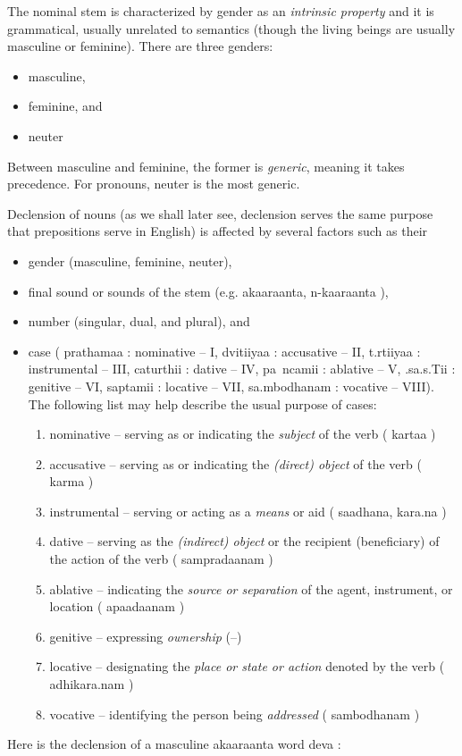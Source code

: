\documentclass[a4paper, 12pt]{article}
\newcommand \sans[1]{
    \textsanskrit{#1}
}
\begin{document}
{    The nominal stem is characterized by gender as an \emph{intrinsic property} and it is grammatical, usually unrelated to semantics (though the living beings are usually masculine or feminine). There are three genders:
    \begin{itemize}
        \item masculine,
        \item feminine, and
        \item neuter
    \end{itemize}
    Between masculine and feminine, the former is \emph{generic}, meaning it takes precedence. For pronouns, neuter is the most generic.

    Declension of nouns (as we shall later see, declension serves the same purpose that prepositions serve in English) is affected by several factors such as 
    their 
    \begin{itemize}
        \item gender (masculine, feminine, neuter), 
        \item final sound or sounds of the stem (e.g. \sans{akaaraanta, n-kaaraanta}), 
        \item number (singular, dual, and plural), and 
        \item case (\sans{prathamaa}: nominative -- I, \sans{dvitiiyaa}: accusative -- II, \sans{t.rtiiyaa}: instrumental -- III, \sans{caturthii}: dative -- IV, \sans{pa~ncamii}: ablative -- V, \sans{.sa.s.Tii}: genitive -- VI, \sans{saptamii}: locative -- VII, \sans{sa.mbodhanam}: vocative -- VIII). The following list may help describe the usual purpose of cases:
            \begin{enumerate}
                \item nominative -- serving as or indicating the \emph{subject} of the verb (\sans{kartaa})
                \item accusative -- serving as or indicating the \emph{(direct) object} of the verb (\sans{karma})
                \item instrumental -- serving or acting as a \emph{means} or aid (\sans{saadhana, kara.na})
                \item dative -- serving as the \emph{(indirect) object} or the recipient (beneficiary) of the action of the verb (\sans{sampradaanam})
                \item ablative -- indicating the \emph{source or separation} of the agent, instrument, or location (\sans{apaadaanam})
                \item genitive -- expressing \emph{ownership} (--)
                \item locative -- designating the \emph{place or state or action} denoted by the verb (\sans{adhikara.nam})
                \item vocative -- identifying the person being \emph{addressed} (\sans{sambodhanam})
            \end{enumerate}
    \end{itemize}

    Here is the declension of a masculine \sans{akaaraanta} word \sans{deva}:

}
\end{document}
